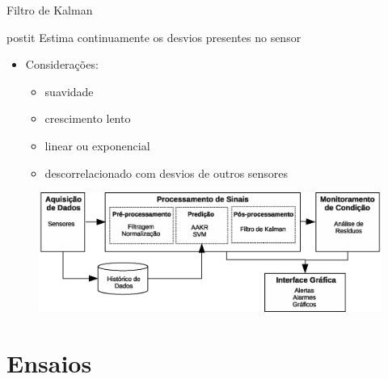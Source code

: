 \documentclass{beamer}
\begin{document}
\begin{frame}{Filtro de Kalman}

    \begin{beamercolorbox}[sep=5pt]{postit}
        Estima continuamente os desvios presentes no sensor
    \end{beamercolorbox}

    \begin{itemize}
        \item Considerações:
            \begin{itemize}
                \item suavidade
                \item crescimento lento
                \item linear ou exponencial
                \item descorrelacionado com desvios de outros sensores
            \end{itemize}
    \end{itemize}

    \begin{figure}[!htb]
        \centering
        \includegraphics[width=\textwidth]{figuras/osa_cbm_drift.eps}
    \end{figure}

    
\end{frame}

\section{Ensaios}
\end{document}
